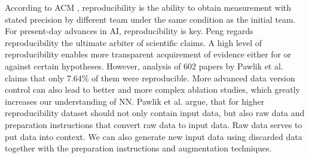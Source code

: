 According to ACM \cite{ACMreproducibility}, reproducibility is the ability to
obtain measurement with stated precision by different team under the same
condition as the initial team. For present-day advances in AI, reproducibility
is key. Peng \cite{peng2011reproducible} regards reproducibility the ultimate
arbiter of scientific claims. A high level of reproducibility enables more
transparent acquirement of evidence either for or against certain hypotheses.
However, analysis of 602 papers by Pawlik et al.\cite{pawlik2019link} claims
that only 7.64\% of them were reproducible. More advanced data version control
can also lead to better and more complex ablation studies, which greatly
increases our understanding of NN. Pawlik et al. \cite{pawlik2019link} argue,
that for higher reproducibility dataset should not only contain input data, but
also raw data and preparation instructions that convert raw data to input data.
Raw data serves to put data into context. We can also generate new input data
using discarded data together with the preparation instructions and augmentation
techniques.

\begin{comment}
As stated by Komsiyski \cite{komsiyski2013binary}, storing multiple
versions of binary files can be expensive.

criteria according to perez et al.
More recently, a trend has started to mint DOIs for other types of scientific
products such as datasets [12] and training materials (for example [13]). A key
motivation for this is to build a framework for giving scientists broader credit
for their work [14,15] while simultaneously supporting clearer, more persistent
ways to cite and track it. Helping to drive this change are funding agencies
such as the National Institutes of Health (NIH) and National Science Foundation
(NSF) in the United States and Research Councils in the United Kingdom, which
are increasingly recognizing the importance of research products such as
publicly available datasets and software. \cite{perez2016ten}
\end{comment}